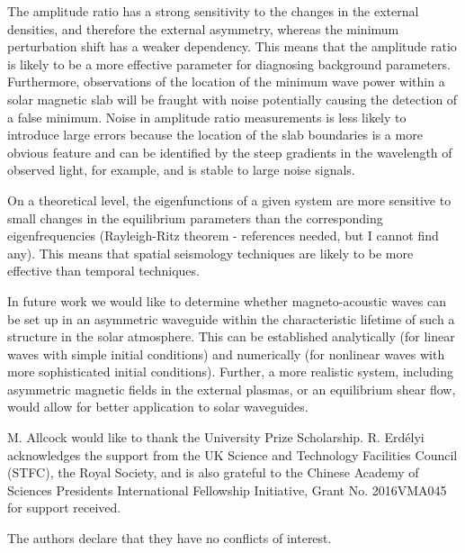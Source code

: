 \documentclass[namedreferences]{solarphysics}
\numberwithin{equation}{section}
\begin{document}
\begin{article}
The amplitude ratio has a strong sensitivity to the changes in the external densities, and therefore the external asymmetry, whereas the minimum perturbation shift has a weaker dependency. This means that the amplitude ratio is likely to be a more effective parameter for diagnosing background parameters. Furthermore, observations of the location of the minimum wave power within a solar magnetic slab will be fraught with noise potentially causing the detection of a false minimum. Noise in amplitude ratio measurements is less likely to introduce large errors because the location of the slab boundaries is a more obvious feature and can be identified by the steep gradients in the wavelength of observed light, for example, and is stable to large noise signals.

On a theoretical level, the eigenfunctions of a given system are more sensitive to small changes in the equilibrium parameters than the corresponding eigenfrequencies (Rayleigh-Ritz theorem - references needed, but I cannot find any). This means that spatial seismology techniques are likely to be more effective than temporal techniques.

In future work we would like to determine whether magneto-acoustic waves can be set up in an asymmetric waveguide within the characteristic lifetime of such a structure in the solar atmosphere. This can be established analytically (for linear waves with simple initial conditions) and numerically (for nonlinear waves with more sophisticated initial conditions). Further, a more realistic system, including asymmetric magnetic fields in the external plasmas, or an equilibrium shear flow, would allow for better application to solar waveguides.

%

%
\begin{acks}
M. Allcock would like to thank the University Prize Scholarship. R. Erd\'{e}lyi acknowledges the support from the UK Science and Technology Facilities Council (STFC), the Royal Society, and is also  grateful to the Chinese Academy of Sciences Presidents International Fellowship Initiative, Grant No. 2016VMA045 for support received. 
\end{acks}

\begin{acks}
The authors declare that they have no conflicts of interest.
\end{acks}





\end{article} 
\end{document}
